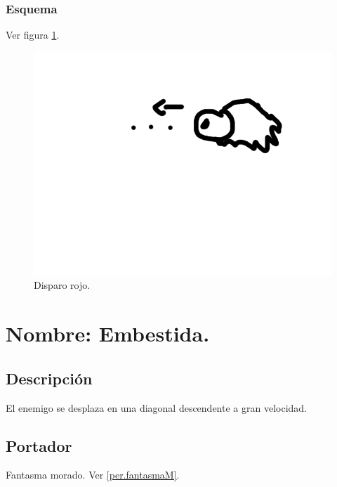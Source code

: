 		\subsubsection{Esquema}
		Ver figura \ref{fig:disparoR}.
		\begin{figure}
			\centering
			\includegraphics[height=0.2 \textheight]{Imagenes/disparoR}
			\caption{Disparo rojo.}
			\label{fig:disparoR}
		\end{figure}
	\section{Nombre: Embestida.} \label{hab.embestida}
		\subsection{Descripción}
		El enemigo se desplaza en una diagonal descendente a gran velocidad.
		\subsection{Portador}
		Fantasma morado. Ver \ref{per.fantasmaM}.
